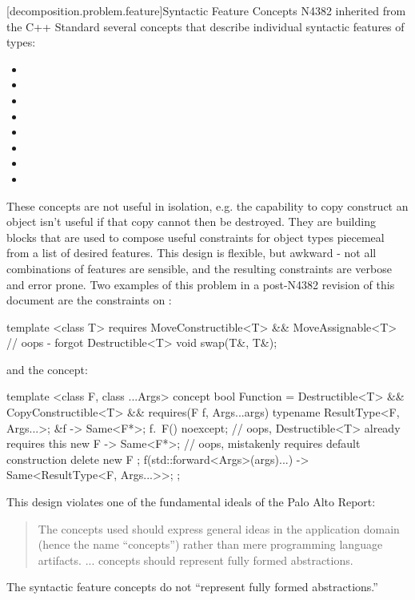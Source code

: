 [decomposition.problem.feature]{Syntactic Feature Concepts}
\pnum
N4382 inherited from the C++ Standard several concepts that describe individual syntactic
features of types:
\begin{itemize}
\item {}
\item {}
\item {}
\item {}
\item {}
\item {}
\item {}
\item {}
\end{itemize}
These concepts are not useful in isolation, e.g. the capability to copy construct an object
isn't useful if that copy cannot then be destroyed. They are building blocks that are used
to compose useful constraints for object types piecemeal from a list of desired features.
This design is flexible, but awkward - not all combinations of features are sensible, and
the resulting constraints are verbose and error prone. Two examples of this problem in
a post-N4382 revision of this document are the constraints on  :
\begin{codeblock}
template <class T>
  requires MoveConstructible<T> && MoveAssignable<T> // oops - forgot Destructible<T>
void swap(T&, T&);
\end{codeblock}
and the  concept:
\begin{codeblock}
template <class F, class ...Args>
concept bool Function =
  Destructible<T> &&
  CopyConstructible<T> &&
  requires(F f, Args...args) {
    typename ResultType<F, Args...>;
    { &f } -> Same<F*>;
    { f.~F() } noexcept;   // oops, Destructible<T> already requires this
    { new F } -> Same<F*>; // oops, mistakenly requires default construction
    { delete new F };
    { f(std::forward<Args>(args)...) } -> Same<ResultType<F, Args...>>;
  };
\end{codeblock}

\pnum
This design violates one of the fundamental ideals of the Palo Alto Report:
\begin{quote}
The concepts used should express general ideas in the application domain (hence the name
``concepts'') rather than mere programming language artifacts. ... concepts should represent
fully formed abstractions.
\end{quote}
The syntactic feature concepts do not ``represent fully formed abstractions.''

